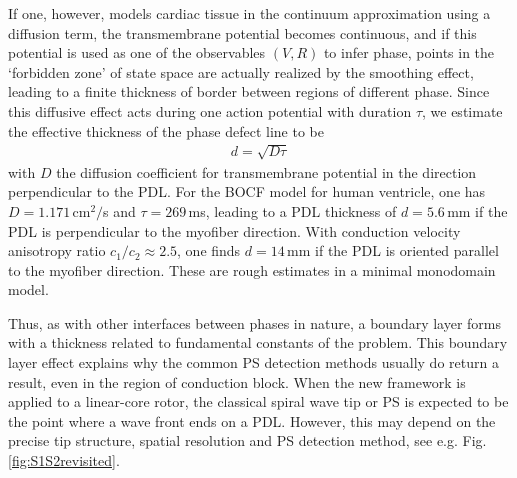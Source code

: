 \documentclass[aps,pre,amsfonts,amssymb,amsmath,twocolumn, superscriptaddress]{revtex4-1}
\begin{document}
If one, however, models cardiac tissue in the continuum approximation using a diffusion term, the transmembrane potential becomes continuous, and if this potential is used as one of the observables $(V,R)$ to infer phase, points in the `forbidden zone' of state space are actually realized by the smoothing effect, leading to a finite thickness of border between regions of different phase. Since this diffusive effect acts during one action potential with duration $\tau$, we estimate the effective thickness of the phase defect line to be
\begin{align}
    d = \sqrt{D \tau}
\end{align}
with $D$ the diffusion coefficient for transmembrane potential in the direction perpendicular to the PDL. For the BOCF model for human ventricle, one has $D=1.171\,$cm$^2/$s and $\tau = 269\,$ms, leading to a PDL thickness of $d=5.6$\,mm if the PDL is perpendicular to the myofiber direction. With conduction velocity anisotropy ratio $c_1/c_2 \approx 2.5$, one finds $d=14\,$mm if the PDL is oriented parallel to the myofiber direction. These are rough estimates in a minimal monodomain model. 

Thus, as with other interfaces between phases in nature, a boundary layer forms with a thickness related to fundamental constants of the problem. This boundary layer effect explains why the common PS detection methods usually do return a result, even in the region of conduction block. When the new framework is applied to a linear-core rotor, the classical spiral wave tip or PS is expected to be the point where a wave front ends on a PDL. However, this may depend on the precise tip structure, spatial resolution and PS detection method, see e.g. Fig. \ref{fig:S1S2revisited}. 

\end{document}
